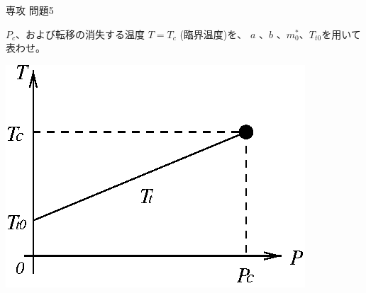 \documentclass[fleqn]{jbook}
\begin{document}
\begin{question}{専攻 問題5}{}
\begin{subquestions}
\SubQuestion
  $P_c$、および転移の消失する温度 $T = T_c$ (臨界温度)を、
  $a$ 、$b$ 、$m_0^{\ast}$、$T_{t0}$を用いて表わせ。

\end{subquestions}

  \begin{center}
    \mbox{\includegraphics[clip]{1996phy5-1.eps}}
  \end{center}

\end{question}
\end{document}

